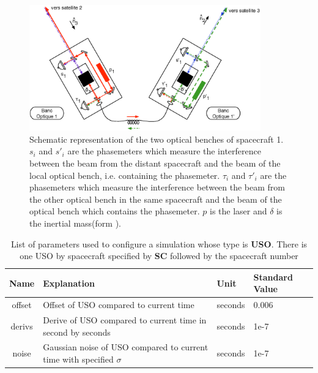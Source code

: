 \documentclass[a4paper,english,12pt]{article}
\begin{document}
\begin{figure}[!htb]
\centering \includegraphics[width=10cm]{Figures/SchBOSC1.eps} 
\caption{\small Schematic representation of the two optical benches of spacecraft 1.  
$s_{i}$ and $s'_{i}$ are the phasemeters which measure the interference between the  
beam from the distant spacecraft and the beam of  the local optical bench, i.e.  
containing the phasemeter. $\tau_{i}$ and $\tau'_{i}$ are the phasemeters which measure  
the interference between the beam from the other optical bench in the same spacecraft  
and the beam of the optical bench which contains the phasemeter. $p$ is the laser and   
$\delta$ is the inertial mass(form \cite{TDITinto}).}   
\label{SchBOSC1} 
\end{figure}

\begin{table}[p]
\caption{List of parameters used to configure a simulation whose type is  \textbf{USO}. There is one USO by spacecraft specified by \textbf{SC} followed by the spacecraft number}
\begin{center} 
\begin{tabular}{|c|p{}|p{}|p{}|} 
\hline
Name & Explanation & Unit & Standard Value  \\ 
\hline
 offset & Offset of USO compared to current time & seconds & 0.006 \\ 
\hline
 derivs & Derive of USO compared to current time in second by seconds & seconds & 1e-7 \\ 
\hline
 noise & Gaussian noise of USO compared to current time  with specified $\sigma$& seconds & 1e-7 \\ 
\hline
\end{tabular} 
\end{center} 
\label{table_paramUSO} 
\end{table}
\end{document}

